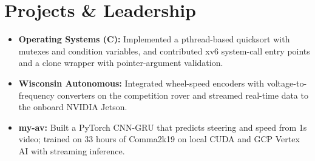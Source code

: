\documentclass[11pt, letterpaper]{article}
\begin{document}
\section{Projects \& Leadership}
\begin{itemize}
  \item \textbf{Operating Systems (C):} Implemented a pthread-based quicksort with mutexes and condition variables, and contributed xv6 system-call entry points and a clone wrapper with pointer-argument validation.
  \item \textbf{Wisconsin Autonomous:} Integrated wheel-speed encoders with voltage-to-frequency converters on the competition rover and streamed real-time data to the onboard NVIDIA Jetson.
  \item \textbf{my-av:} Built a PyTorch CNN-GRU that predicts steering and speed from 1s video; trained on 33 hours of Comma2k19 on local CUDA and GCP Vertex AI with streaming inference.
\end{itemize}
\end{document}
